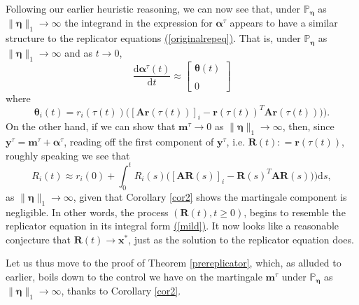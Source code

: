 \documentclass[12pt, leqno]{article}
\renewcommand{\eqref}[1]{\hyperref[#1]{(\ref*{#1})}}
\newcommand*{\norm}[1]{\lVert #1 \rVert}
\newcommand{\dd}{{\mathrm d}}
\begin{document}
\medskip

Following our earlier heuristic reasoning, we can now see that, under $\mathbb{P}_{\bm\eta}$ as $\norm{\bm\eta}_1\to\infty$ the integrand in the expression for $\bm\alpha^\tau$ appears to have a similar structure to the replicator equations \eqref{originalrepeq}. That is, under $\mathbb{P}_{\bm\eta}$ as $\norm{\bm\eta}_1\to\infty$ and as $t\to 0$,
\[
\frac{\dd \bm\alpha^\tau(t)}{\dd t}\approx 
\begin{bmatrix}\bm\theta(t)\\ \\ 0 \end{bmatrix}
\] 
where
\[
\bm\theta_i(t) = { r}_i(\tau(t) )\Big([\bm A\bm r(\tau(t))]_i  -\bm r(\tau(t))^T\bm A\bm r(\tau(t)))       \Big).
\]
On the other hand, if we can show that $\bm m^\tau\to0$ as $\norm{\bm\eta}_1\to\infty$, then, since $\bm y^\tau = \bm  m^\tau + \bm\alpha^\tau $, 
reading off the first component of $\bm y^\tau$, i.e. $\bm R(t): = \bm r(\tau(t))$, roughly speaking we see that 
\[
R_i(t) \approx  r_i(0)+  \int_0^t  R_i(s )\Big([\bm A\bm R(s)]_i  -\bm R(s)^T\bm A\bm R(s))       \Big)\dd s,
\]
as $\norm{\bm\eta}_1\to\infty$, given that Corollary \ref{cor2} shows the martingale component is negligible. In other words, the process $(\bm R (t), t\geq0)$, begins to resemble the replicator equation in its integral form \eqref{mild}. It now looks like a reasonable conjecture that $\bm R(t)\to \bm x^*$, just as the solution to the replicator equation does. 

\medskip

Let us thus move to the proof of Theorem \ref{prereplicator}, which, as alluded to earlier, boils down to the control we have on  the martingale $\bm m^\tau$ under $\mathbb{P}_{\bm\eta}$ as $\norm{\bm \eta}_1\to\infty$, thanks to Corollary \ref{cor2}. 
\end{document}
